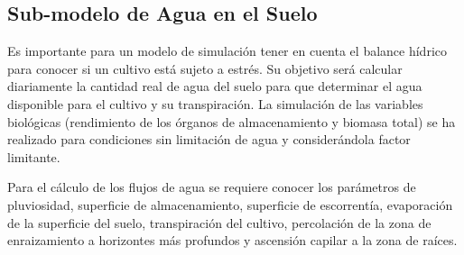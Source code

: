 \subsection{Sub-modelo de Agua en el Suelo \parencite{sebem2005aportaciones}}

Es importante para un modelo de simulación tener en cuenta el balance hídrico para conocer si un cultivo está sujeto a estrés. Su objetivo será calcular diariamente la cantidad real de agua del suelo para que determinar el agua disponible para el cultivo y su transpiración. La simulación de las variables biológicas (rendimiento de los órganos de almacenamiento y biomasa total) se ha realizado para condiciones sin limitación de agua y considerándola factor limitante. 

Para el cálculo de los flujos de agua se requiere conocer los parámetros de pluviosidad, superficie de almacenamiento, superficie de escorrentía, evaporación de la superficie del suelo, transpiración del cultivo, percolación de la zona de enraizamiento a horizontes más profundos y ascensión capilar a la zona de raíces. 

